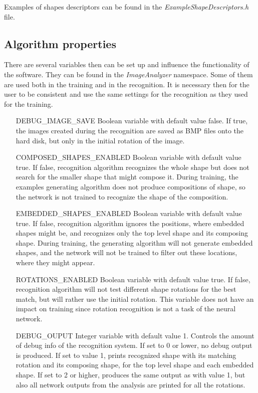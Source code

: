 Examples of shapes descriptors can be found in the \emph{ExampleShapeDescriptors.h} file.

\subsection{Algorithm properties}
There are several variables then can be set up and influence the functionality of the software. They can be found in the \emph{ImageAnalyzer} namespace. Some of them are used both in the training and in the recognition. It is necessary then for the user to be consistent and use the same settings for the recognition as they used for the training.

\begin{enumerate}
\item [DEBUG\_IMAGE\_SAVE] Boolean variable with default value false. If true, the images created during the recognition are saved as BMP files onto the hard disk, but only in the initial rotation of the image.

\item [COMPOSED\_SHAPES\_ENABLED] Boolean variable with default value true. If false, recognition algorithm recognizes the whole shape but does not search for the smaller shape that might compose it. During training, the examples generating algorithm does not produce compositions of shape, so the network is not trained to recognize the shape of the composition.

\item [EMBEDDED\_SHAPES\_ENABLED] Boolean variable with default value true. If false, recognition algorithm ignores the positions, where embedded shapes might be, and recognizes only the top level shape and its composing shape. During training, the generating algorithm will not generate embedded shapes, and the network will not be trained to filter out these locations, where they might appear.

\item [ROTATIONS\_ENABLED] Boolean variable with default value true. If false, recognition algorithm will not test different shape rotations for the best match, but will rather use the initial rotation. This variable does not have an impact on training since rotation recognition is not a task of the neural network.

\item [DEBUG\_OUPUT] Integer variable with default value 1. Controls the amount of debug info of the recognition system. If set to 0 or lower, no debug output is produced. If set to value 1, prints recognized shape with its matching rotation and its composing shape, for the top level shape and each embedded shape. If set to 2 or higher, produces the same output as with value 1, but also all network outputs from the analysis are printed for all the rotations.


\end{enumerate}

